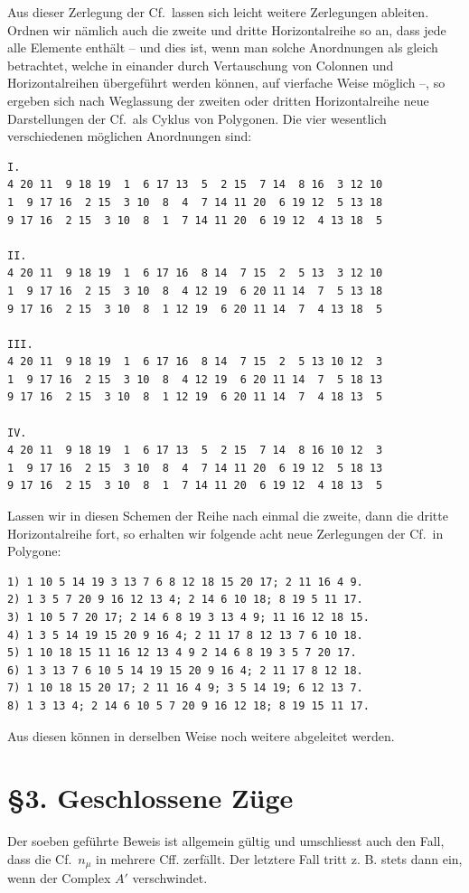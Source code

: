 \documentclass[11pt]{article}
\newcommand{\Cf}{\textup{Cf.}}
\begin{document}
Aus dieser Zerlegung der \Cf\ lassen sich leicht weitere Zerlegungen ableiten. Ordnen wir nämlich auch die zweite und dritte Horizontalreihe so an, dass jede alle Elemente enthält -- und dies ist, wenn man solche Anordnungen als gleich betrachtet, welche in einander durch Vertauschung von Colonnen und Horizontalreihen übergeführt werden können, auf vierfache Weise möglich --, so ergeben sich nach Weglassung der zweiten oder dritten Horizontalreihe neue Darstellungen der \Cf\ als Cyklus von Polygonen. Die vier wesentlich verschiedenen möglichen Anordnungen sind:
\small
\begin{verbatim}
I.
4 20 11  9 18 19  1  6 17 13  5  2 15  7 14  8 16  3 12 10
1  9 17 16  2 15  3 10  8  4  7 14 11 20  6 19 12  5 13 18
9 17 16  2 15  3 10  8  1  7 14 11 20  6 19 12  4 13 18  5

II.
4 20 11  9 18 19  1  6 17 16  8 14  7 15  2  5 13  3 12 10
1  9 17 16  2 15  3 10  8  4 12 19  6 20 11 14  7  5 13 18
9 17 16  2 15  3 10  8  1 12 19  6 20 11 14  7  4 13 18  5

III.
4 20 11  9 18 19  1  6 17 16  8 14  7 15  2  5 13 10 12  3
1  9 17 16  2 15  3 10  8  4 12 19  6 20 11 14  7  5 18 13
9 17 16  2 15  3 10  8  1 12 19  6 20 11 14  7  4 18 13  5

IV.
4 20 11  9 18 19  1  6 17 13  5  2 15  7 14  8 16 10 12  3
1  9 17 16  2 15  3 10  8  4  7 14 11 20  6 19 12  5 18 13
9 17 16  2 15  3 10  8  1  7 14 11 20  6 19 12  4 18 13  5
\end{verbatim}
\normalsize
Lassen wir in diesen Schemen der Reihe nach einmal die zweite, dann die dritte Horizontalreihe fort, so erhalten wir folgende acht neue Zerlegungen der \Cf\ in Polygone:
\small
\begin{verbatim}
1) 1 10 5 14 19 3 13 7 6 8 12 18 15 20 17; 2 11 16 4 9.
2) 1 3 5 7 20 9 16 12 13 4; 2 14 6 10 18; 8 19 5 11 17.
3) 1 10 5 7 20 17; 2 14 6 8 19 3 13 4 9; 11 16 12 18 15.
4) 1 3 5 14 19 15 20 9 16 4; 2 11 17 8 12 13 7 6 10 18.
5) 1 10 18 15 11 16 12 13 4 9 2 14 6 8 19 3 5 7 20 17.
6) 1 3 13 7 6 10 5 14 19 15 20 9 16 4; 2 11 17 8 12 18.
7) 1 10 18 15 20 17; 2 11 16 4 9; 3 5 14 19; 6 12 13 7.
8) 1 3 13 4; 2 14 6 10 5 7 20 9 16 12 18; 8 19 15 11 17.
\end{verbatim}
\normalsize
Aus diesen können in derselben Weise noch weitere abgeleitet werden.

\section*{\S 3. Geschlossene Züge}
Der soeben geführte Beweis ist allgemein gültig und umschliesst auch den Fall, dass die \Cf\ $n_\mu$ in mehrere Cff. zerfällt. Der letztere Fall tritt z. B. stets dann ein, wenn der Complex $A'$ verschwindet.
\end{document}
